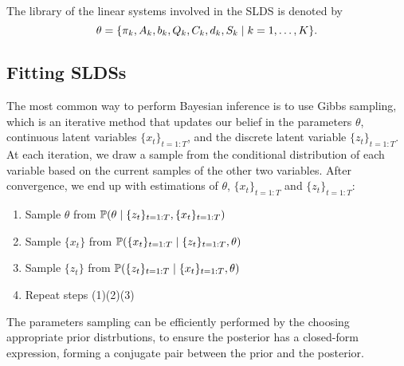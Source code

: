 The library of the linear systems involved in the SLDS is denoted by
\[\theta = {\left\{\pi_k, A_k, b_k, Q_k, C_k, d_k, S_k \mid k = 1, \dots, K\right\}}.\]

\subsection{Fitting SLDSs}

  

The most common way to perform Bayesian inference is to use Gibbs sampling, which is an iterative method that updates our belief in the parameters $\theta$, continuous latent variables $\{x_{t}\}_{t=1:T}$, and the discrete latent variable $\{z_t\}_{t=1:T}$. At each iteration, we draw a sample from the conditional distribution of each variable based on the current samples of the other two variables. After convergence, we end up with estimations of $\theta$, $\{x_{t}\}_{t=1:T}$ and $\{z_t\}_{t=1:T}$:
\begin{enumerate}
  \item Sample $\theta$ from $\mathbb{P}(\theta \mid \{z_t\}_{t=1:T}, \{x_{t}\}_{t=1:T})$
  \item Sample $\{x_t\}$ from $\mathbb{P}(\{x_{t}\}_{t=1:T} \mid \{z_t\}_{t=1:T}, \theta)$
  \item Sample $\{z_t\}$ from $\mathbb{P}(\{z_{t}\}_{t=1:T} \mid \{x_t\}_{t=1:T}, \theta)$
 \item Repeat steps (1)(2)(3) 
\end{enumerate}
The parameters sampling can be efficiently performed by the choosing appropriate prior distrbutions, to ensure the posterior has a closed-form expression, forming a conjugate pair between the prior and the posterior.
 
